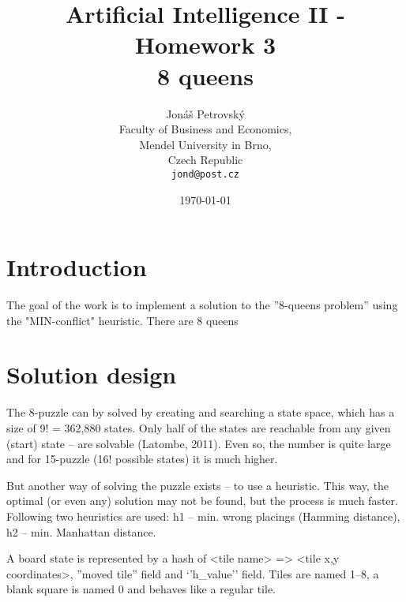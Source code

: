 \documentclass[a4paper]{article}
\begin{document}
\title{\vspace{-1.0cm}Artificial Intelligence II - Homework 3 \\ \textbf{8 queens}}
\author{Jonáš Petrovský\\
        Faculty of Business and Economics,\\
		Mendel University in Brno,\\
		Czech Republic \\
		\texttt{jond@post.cz}}
\date{\today}
\maketitle

\section{Introduction}
The goal of the work is to implement a solution to the ''8-queens problem'' using the "MIN-conflict" heuristic. There are 8 queens 

\section{Solution design}
The 8-puzzle can by solved by creating and searching a state space, which has a size of 9! = 362,880 states. Only half of the states are reachable from any given (start) state -- are solvable (Latombe, 2011). Even so, the number is quite large and for 15-puzzle (16! possible states) it is much higher. 

But another way of solving the puzzle exists -- to use a heuristic. This way, the optimal (or even any) solution may not be found, but the process is much faster. Following two heuristics are used: h1 -- min. wrong placings (Hamming distance), h2 -- min. Manhattan distance.

A board state is represented by a hash of <tile name> => <tile x,y coordinates>, ''moved tile'' field and `'h\_value'' field. Tiles are named 1--8, a blank square is named 0 and behaves like a regular tile. 
\end{document}
